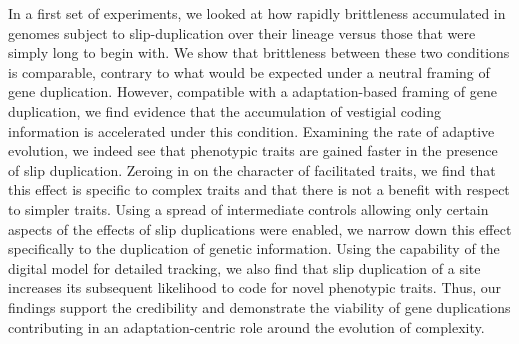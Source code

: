 In a first set of experiments, we looked at how rapidly brittleness accumulated in genomes subject to slip-duplication over their lineage versus those that were simply long to begin with.
We show that brittleness between these two conditions is comparable, contrary to what would be expected under a neutral framing of gene duplication.
However, compatible with a adaptation-based framing of gene duplication, we find evidence that the accumulation of vestigial coding information is accelerated under this condition.
Examining the rate of adaptive evolution, we indeed see that phenotypic traits are gained faster in the presence of slip duplication.
Zeroing in on the character of facilitated traits, we find that this effect is specific to complex traits and that there is not a benefit with respect to simpler traits.
Using a spread of intermediate controls allowing only certain aspects of the effects of slip duplications were enabled, we narrow down this effect specifically to the duplication of genetic information.
Using the capability of the digital model for detailed tracking, we also find that slip duplication of a site increases its subsequent likelihood to code for novel phenotypic traits.
Thus, our findings support the credibility and demonstrate the viability of gene duplications contributing in an adaptation-centric role around the evolution of complexity.



